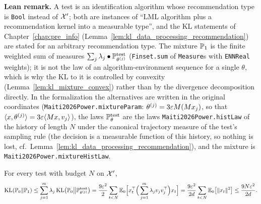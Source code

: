\textbf{Lean remark.} A test is an identification algorithm whose recommendation type is
\texttt{Bool} instead of $\mathcal{X}'$; both are instances of ``LML algorithm plus a recommendation
kernel into a measurable type'', and the KL statements of Chapter~\ref{chap:pre_info}
(Lemma~\ref{lem:kl_data_processing_recommendation}) are stated for an arbitrary
recommendation type. The mixture $\mathbb{P}_1$ is the finite weighted sum of measures
$\sum_j \lambda_j \bullet \mathbb{P}^{\mathrm{test}}_{\theta^{(j)}}$ (\texttt{Finset.sum} of \texttt{Measure}s with
\texttt{ENNReal} weights); it is not the law of an algorithm-environment sequence for a
single $\theta$, which is why the KL to it is controlled by convexity
(Lemma~\ref{lem:kl_mixture_convex}) rather than by the divergence decomposition directly.
In the formalization the alternatives are written in the original coordinates
(\texttt{Maiti2026Power.mixtureParam}: $\theta^{(j)} = 3\varepsilon M(Mx_j)$, so that
$\langle x, \theta^{(j)} \rangle = 3\varepsilon\langle Mx, v_j \rangle$), the laws $\mathbb{P}^{\mathrm{test}}_\theta$ are the laws
\texttt{Maiti2026Power.histLaw} of the history of length $N$ under the canonical trajectory measure of
the test's sampling rule (the decision is a measurable function of this history, so nothing is
lost, cf.\ Lemma~\ref{lem:kl_data_processing_recommendation}), and the mixture is
\texttt{Maiti2026Power.mixtureHistLaw}.

\begin{lemma}\label{lem:mixture_kl}
\leanok
{}
For every test with budget $N$ on $\mathcal{X}'$,
\[
  \mathrm{KL}(\mathbb{P}_0\|\mathbb{P}_1)
  \le \sum_{j=1}^m \lambda_j\, \mathrm{KL}\big(\mathbb{P}_0 \big\| \mathbb{P}^{\mathrm{test}}_{\theta^{(j)}}\big)
  = \frac{9\varepsilon^2}{2}\sum_{t<N}\mathbb{E}_0\Big[ x_t^\top \Big(\sum_{j=1}^m\lambda_j v_jv_j^\top\Big) x_t \Big]
  = \frac{9\varepsilon^2}{2d}\sum_{t<N}\mathbb{E}_0\big[\lVert x_t \rVert^2\big]
  \le \frac{9 N \varepsilon^2}{2d} .
\]
\end{lemma}


